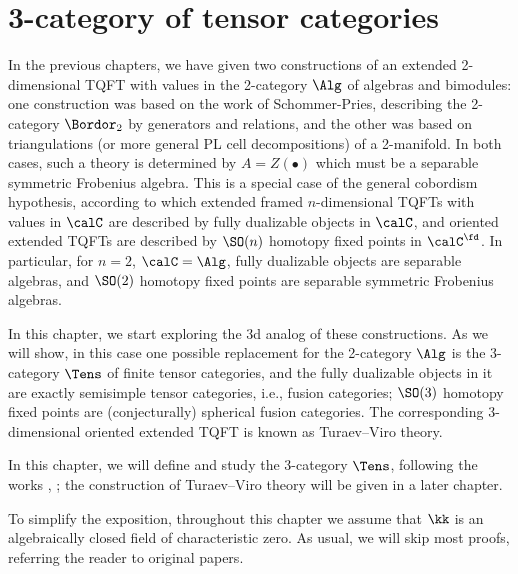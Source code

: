 \chapter{3-category of tensor categories}\label{c:3cat-tens}

In the previous chapters, we have given two constructions of an extended
2-dimensional TQFT with values in the 2-category $\Alg$ of algebras and
bimodules: one construction was based on the work of Schommer-Pries, describing
the 2-category $\Bordor_2$ by generators and relations, and the other was based
on triangulations (or more general PL cell decompositions) of a 2-manifold. In
both cases, such a theory is determined by $A=Z(\bullet)$ which must be a
separable symmetric Frobenius algebra. This is a special case of the general
cobordism hypothesis, according to which extended framed $n$-dimensional TQFTs
with values in $\calC$ are described by fully dualizable objects in $\calC$, and
oriented extended TQFTs are described by $\SO(n)$ homotopy fixed points in
$\calC^{\fd}$. In particular, for $n=2$, $\calC=\Alg$, fully dualizable objects
are separable algebras, and $\SO(2)$ homotopy fixed points are
separable symmetric Frobenius algebras.

In this chapter, we start exploring the 3d analog of these constructions. As we
will show, in this case one possible replacement for the 2-category $\Alg$ is
the 3-category $\Tens$ of finite tensor categories, and the fully dualizable
objects in it are exactly semisimple tensor categories, i.e., fusion categories;
$\SO(3)$ homotopy fixed points are (conjecturally) spherical fusion categories.
The corresponding 3-dimensional oriented extended TQFT is known as Turaev--Viro
theory.

In this chapter, we will define and study the 3-category $\Tens$, following
the works , ; the construction of
Turaev--Viro theory will be given in a later chapter.

To simplify the exposition, throughout this chapter we assume that $\kk$ is an
algebraically closed field of characteristic zero. As usual, we will skip most
proofs, referring the reader to original papers.

